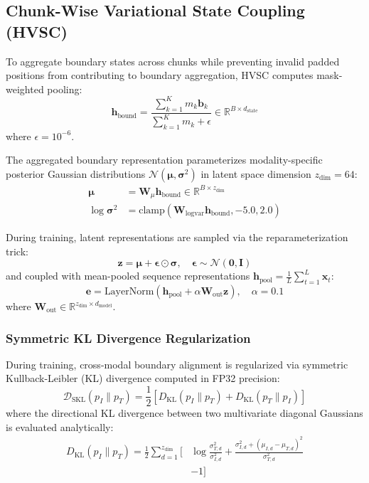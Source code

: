 \documentclass[journal]{IEEEtran}
\begin{document}
\subsection{Chunk-Wise Variational State Coupling (HVSC)}
To aggregate boundary states across chunks while preventing invalid padded positions from contributing to boundary aggregation, HVSC computes mask-weighted pooling:
\begin{equation}
\mathbf{h}_{\text{bound}} = \frac{\sum_{k=1}^K m_k \mathbf{b}_k}{\sum_{k=1}^K m_k + \epsilon} \in \mathbb{R}^{B \times d_{\text{state}}}
\end{equation}
where $\epsilon = 10^{-6}$.

The aggregated boundary representation parameterizes modality-specific posterior Gaussian distributions $\mathcal{N}(\boldsymbol{\mu}, \boldsymbol{\sigma}^2)$ in latent space dimension $z_{\text{dim}} = 64$:
\begin{align}
\boldsymbol{\mu} &= \mathbf{W}_\mu \mathbf{h}_{\text{bound}} \in \mathbb{R}^{B \times z_{\text{dim}}} \\
\log \boldsymbol{\sigma}^2 &= \text{clamp}(\mathbf{W}_{\text{logvar}} \mathbf{h}_{\text{bound}}, -5.0, 2.0)
\end{align}

During training, latent representations are sampled via the reparameterization trick:
\begin{equation}
\mathbf{z} = \boldsymbol{\mu} + \boldsymbol{\epsilon} \odot \boldsymbol{\sigma}, \quad \boldsymbol{\epsilon} \sim \mathcal{N}(\mathbf{0}, \mathbf{I})
\end{equation}
and coupled with mean-pooled sequence representations $\mathbf{h}_{\text{pool}} = \frac{1}{L}\sum_{t=1}^L \mathbf{x}_t$:
\begin{equation}
\mathbf{e} = \text{LayerNorm}(\mathbf{h}_{\text{pool}} + \alpha \mathbf{W}_{\text{out}} \mathbf{z}), \quad \alpha = 0.1
\end{equation}
where $\mathbf{W}_{\text{out}} \in \mathbb{R}^{z_{\text{dim}} \times d_{\text{model}}}$.

\subsubsection{Symmetric KL Divergence Regularization}
During training, cross-modal boundary alignment is regularized via symmetric Kullback-Leibler (KL) divergence computed in FP32 precision:
\begin{equation}
\mathcal{D}_{\text{SKL}}(p_I \parallel p_T) = \frac{1}{2} \left[ D_{\text{KL}}(p_I \parallel p_T) + D_{\text{KL}}(p_T \parallel p_I) \right]
\end{equation}
where the directional KL divergence between two multivariate diagonal Gaussians is evaluated analytically:
\begin{align}
D_{\text{KL}}(p_I \parallel p_T) = \frac{1}{2} \sum_{d=1}^{z_{\text{dim}}} \Bigg[ &\log \frac{\sigma_{T,d}^2}{\sigma_{I,d}^2} + \frac{\sigma_{I,d}^2 + (\mu_{I,d} - \mu_{T,d})^2}{\sigma_{T,d}^2} \nonumber \\
&- 1 \Bigg]
\end{align}
\end{document}
